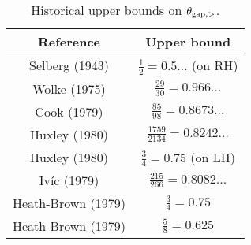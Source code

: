 \begin{table}[ht]
    \caption{Historical upper bounds on $\theta_{\mathrm{gap},>}$.}
    \centering
    \renewcommand{\arraystretch}{1.2}
    \begin{tabular}{|c|c|}
    \hline
    Reference & Upper bound \\
    \hline
    Selberg (1943) \cite{selberg_1943} & $\frac{1}{2}=0.5\dots$ (on RH)\\
    \hline
    Wolke (1975) \cite{wolke_1975} & $\frac{29}{30} = 0.966\dots$ \\
    \hline
    Cook (1979) \cite{cook_1979} & $\frac{85}{98} = 0.8673\dots$ \\
    \hline
    Huxley (1980) \cite{huxley_large_1980} & $\frac{1759}{2134} = 0.8242\dots$ \\
    \hline
    Huxley (1980) \cite{huxley_large_1980} & $\frac{3}{4} = 0.75$ (on LH) \\
    \hline
    Iv\'ic (1979) \cite{ivic_sums_1979} & $\frac{215}{266} = 0.8082\dots$ \\
    \hline
    Heath-Brown (1979) \cite{heath_brown_consecutive_III} & $\frac{3}{4} = 0.75$ \\
    \hline
    Heath-Brown (1979) \cite{heath_brown_consecutive_II} & $\frac{5}{8} = 0.625$ \\
    \hline
    \end{tabular}
    \end{table}\label{gaplarge-table}
